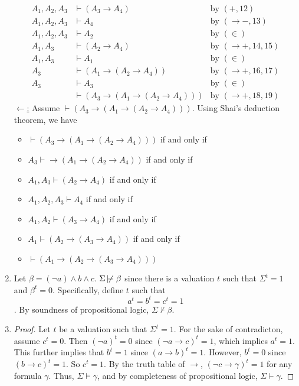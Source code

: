 \documentclass[12pt]{article}
\begin{document}
\begin{enumerate}
\begin{align}
                A_1,A_2, A_3 &\vdash (A_3\to A_4)&\text{by }(+, 12) \\
                A_1,A_2,A_3 &\vdash A_4&\text{by }(\to -, 13)\\
                A_1,A_2,A_3 &\vdash A_2&\text{by }(\in )\\
                A_1, A_3&\vdash (A_2\to A_4)&\text{by }(\to +, 14, 15) \\
                A_1, A_3&\vdash A_1&\text{by }(\in) \\
                A_3&\vdash (A_1\to (A_2\to A_4))&\text{by }(\to +, 16, 17) \\
                A_3&\vdash A_3&\text{by }(\in) \\
                &\vdash (A_3\to (A_1\to (A_2\to A_4)))&\text{by }(\to +, 18, 19)
            \end{align}
            \underline{$\leftarrow$:} Assume $\vdash (A_3\to (A_1\to (A_2\to A_4)))$. Using Shai's deduction theorem, we have 
            \begin{itemize}
                \item $\vdash (A_3\to (A_1\to (A_2\to A_4)))$ if and only if
                \item $A_3 \vdash \to (A_1\to (A_2\to A_4))$ if and only if
                \item $A_1, A_3\vdash (A_2\to A_4)$ if and only if
                \item $A_1,A_2,A_3\vdash A_4$ if and only if
                \item $A_1,A_2\vdash (A_3\to A_4)$ if and only if
                \item $A_1\vdash (A_2\to (A_3\to A_4))$ if and only if 
                \item $\vdash (A_1\to (A_2\to (A_3\to A_4)))$
            \end{itemize}
        \item Let $\beta=(\neg a)\land b\land c$. $\Sigma\not\!\models \beta$ since there is a valuation $t$ such that $\Sigma^t=1$ and $\beta^t=0$. Specifically, define $t$ such that \[a^t=b^t=c^t=1\]. By soundness of propositional logic, $\Sigma\nvdash \beta$.
        \item 
        \begin{proof}
            Let $t$ be a valuation such that $\Sigma^t=1$. For the sake of contradicton, assume $c^t=0$. Then $(\neg a)^t=0$ since $(\neg a\to c)^t=1$, which implies $a^t=1$. This further implies that $b^t=1$ since $(a\to b)^t=1$. However, $b^t=0$ since $(b\to c)^t=1$. So $c^t=1$. By the truth table of $\to$, $(\neg c\to \gamma)^t=1$ for any formula $\gamma$. Thus, $\Sigma\models\gamma$, and by completeness of propositional logic, $\Sigma\vdash\gamma$.
        \end{proof}
    \end{enumerate}
\end{document}
